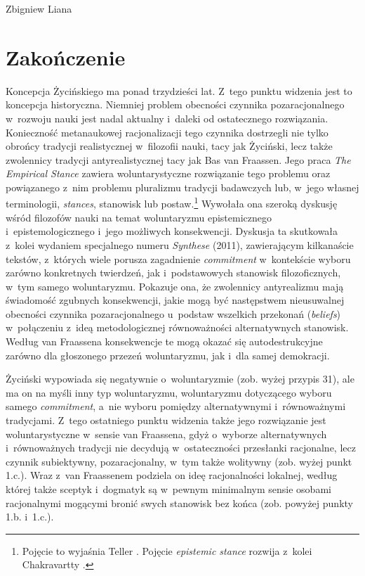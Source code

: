 \begin{artplenv}{Zbigniew Liana}
\section{Zakończenie}
Koncepcja Życińskiego ma ponad trzydzieści lat. Z~tego punktu widzenia jest to koncepcja historyczna. Niemniej problem obecności czynnika pozaracjonalnego w~rozwoju nauki jest nadal aktualny i~daleki od ostatecznego rozwiązania. Konieczność metanaukowej racjonalizacji tego czynnika dostrzegli nie tylko obrońcy tradycji realistycznej w~filozofii nauki, tacy jak Życiński, lecz także zwolennicy tradycji antyrealistycznej tacy jak Bas van Fraassen. Jego praca \textit{The Empirical Stance}
\parencite*[][]{van_fraassen_empirical_2002} %
 zawiera woluntarystyczne rozwiązanie tego problemu oraz powiązanego z~nim problemu pluralizmu tradycji badawczych lub, w~jego własnej terminologii, \textit{stances}, stanowisk lub postaw.\footnote{Pojęcie to wyjaśnia Teller 
\parencite*[][]{teller_discussion_2004}. %
 Pojęcie \textit{epistemic stance} rozwija z~kolei Chakravartty 
\parencite*[][]{chakravartty_puzzle_2011}.%
} Wywołała ona szeroką dyskusję wśród filozofów nauki na temat woluntaryzmu epistemicznego i~epistemologicznego i~jego możliwych konsekwencji. Dyskusja ta skutkowała z~kolei wydaniem specjalnego numeru \textit{Synthese} (2011), zawierającym kilkanaście tekstów, z~których wiele porusza %
zagadnienie \textit{commitment} w~kontekście wyboru zarówno konkretnych twierdzeń, jak i~podstawowych stanowisk filozoficznych, w~tym samego woluntaryzmu. Pokazuje ona, że zwolennicy antyrealizmu mają świadomość zgubnych konsekwencji, jakie mogą być następstwem nieusuwalnej obecności czynnika pozaracjonalnego u~podstaw wszelkich przekonań (\textit{beliefs}) w~połączeniu z~ideą metodologicznej równoważności alternatywnych stanowisk. Według van Fraassena
\parencite*[][s.~158]{van_fraassen_stance_2011} %
 konsekwencje te mogą okazać się autodestrukcyjne zarówno dla głoszonego przezeń woluntaryzmu, jak i~dla samej demokracji.

Życiński wypowiada się negatywnie o~woluntaryzmie (zob. wyżej przypis 31), ale ma on na myśli inny typ woluntaryzmu, woluntaryzmu dotyczącego wyboru samego \textit{commitment}, a~nie wyboru pomiędzy alternatywnymi i~równoważnymi tradycjami. Z~tego ostatniego punktu widzenia także jego rozwiązanie jest woluntarystyczne w~sensie van Fraassena, gdyż o~wyborze alternatywnych i~równoważnych tradycji nie decydują w~ostateczności przesłanki racjonalne, lecz czynnik subiektywny, pozaracjonalny, w~tym także wolitywny (zob. wyżej punkt 1.c.). Wraz z~van Fraassenem podziela on ideę racjonalności lokalnej, według której także sceptyk i~dogmatyk są w~pewnym minimalnym sensie osobami racjonalnymi mogącymi bronić swych stanowisk bez końca (zob. powyżej punkty 1.b. i~1.c.).


\end{artplenv}
